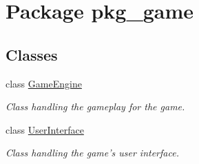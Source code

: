 \hypertarget{namespacepkg__game}{\section{Package pkg\-\_\-game}
\label{namespacepkg__game}
}
\subsection*{Classes}
\begin{DoxyCompactItemize}
\item 
class \hyperlink{classpkg__game_1_1GameEngine}{Game\-Engine}
\begin{DoxyCompactList}\small\item\em Class handling the gameplay for the game. \end{DoxyCompactList}\item 
class \hyperlink{classpkg__game_1_1UserInterface}{User\-Interface}
\begin{DoxyCompactList}\small\item\em Class handling the game's user interface. \end{DoxyCompactList}\end{DoxyCompactItemize}
